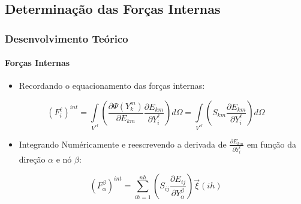 \documentclass{beamer}
\begin{document}
\subsection{Determinação das Forças Internas}
\begin{frame}
    \frametitle{Desenvolvimento Teórico}
        \framesubtitle{Forças Internas} 
        \begin{itemize}
            \item Recordando o equacionamento das forças internas:
        \end{itemize}
        \begin{equation}
            \left(F^\ell_i\right)^{int} = 
            \int\limits_{V^{el}} \left(\frac{\partial\Psi(Y_k^m)}{\partial E_{km}}\frac{\partial E_{km}}{\partial Y_i^\ell}\right) d\Omega 
            = 
            \int\limits_{V^{el}} \left(S_{km}\frac{\partial E_{km}}{\partial Y_i^\ell}\right) d\Omega
        \end{equation}
        
        \begin{itemize}
            \item Integrando Numéricamente e reescrevendo a derivada de \(\frac{\partial E_{km}}{\partial Y_i^\ell}\) em função da direção \(\alpha\) e nó \(\beta\):
        \end{itemize}
        
        \begin{equation}
            \left(F^\beta_\alpha\right)^{int}= \sum_{ih=1}^{nh} \left(S_{ij}\frac{\partial E_{ij}}{\partial Y_\alpha^\beta}\right) \vec{\xi}(ih) 
        \end{equation}

\end{frame}
\end{document}
